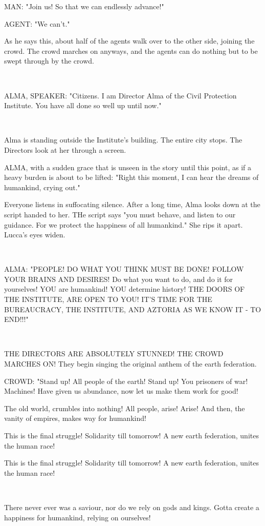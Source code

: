 \documentclass[11pt]{article}
\begin{document}
MAN: "Join us! So that we can endlessly advance!"

AGENT: "We can't."

As he says this, about half of the agents walk over to the other side, joining the crowd.
The crowd marches on anyways, and the agents can do nothing but to be swept through by the crowd. 

\ 

ALMA, SPEAKER: "Citizens. I am Director Alma of the Civil Protection Institute.
You have all done so well up until now."

\ 

Alma is standing outside the Institute's building.
The entire city stops.
The Directors look at her through a screen.

ALMA, with a sudden grace that is unseen in the story until this point, as if a heavy burden is about to be lifted: "Right this moment, I can hear the dreams of humankind, crying out."

Everyone listens in suffocating silence.
After a long time, Alma looks down at the script handed to her.
THe script says "you must behave, and listen to our guidance. 
For we protect the happiness of all humankind."
She rips it apart.
Lucca's eyes widen.

\ 

ALMA: "PEOPLE! 
DO WHAT YOU THINK MUST BE DONE!
FOLLOW YOUR BRAINS AND DESIRES!
Do what you want to do, and do it for yourselves!
YOU are humankind! 
YOU determine history!
THE DOORS OF THE INSTITUTE, ARE OPEN TO YOU!
IT'S TIME FOR THE BUREAUCRACY, THE INSTITUTE, AND AZTORIA AS WE KNOW IT - TO END!!!"

\ 

THE DIRECTORS ARE ABSOLUTELY STUNNED! THE CROWD MARCHES ON! 
They begin singing the original anthem of the earth federation.

CROWD: "Stand up! All people of the earth! 
Stand up! You prisoners of war!
Machines! Have given us abundance,
now let us make them work for good! 

The old world, crumbles into nothing! 
All people, arise! Arise! 
And then, the vanity of empires,
makes way for humankind!

This is the final struggle! 
Solidarity till tomorrow!
A new earth federation,
unites the human race! 

This is the final struggle!
Solidarity till tomorrow!
A new earth federation,
unites the human race!

\ 

There never ever was a saviour,
nor do we rely on gods and kings.
Gotta create a happiness for humankind,
relying on ourselves!
\end{document}
